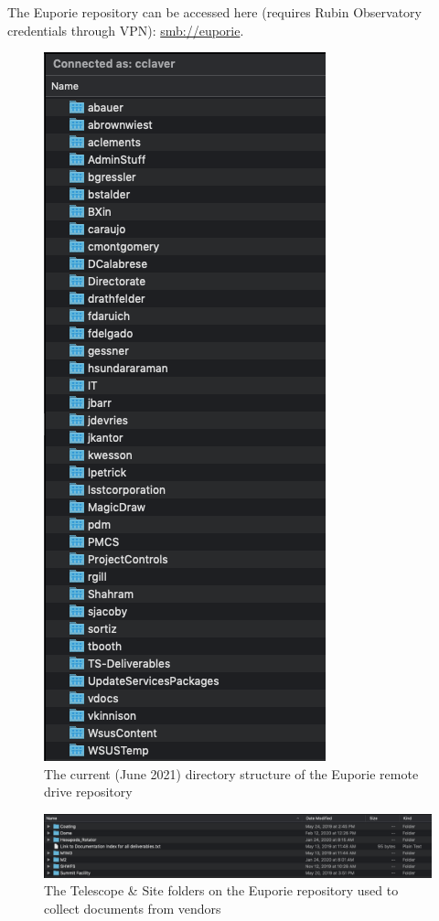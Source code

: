 The Euporie repository can be accessed here (requires Rubin Observatory credentials through VPN): \url{smb://euporie}.

\begin{figure}
\begin{center}
  \includegraphics[scale=0.5]{Figures/EuporieDirectory.png}
\end{center}
\caption{\label{fig:EuporyDirectory} The current (June 2021) directory structure of the Euporie remote drive repository}
\end{figure}

\begin{figure}
\begin{center}
  \includegraphics[scale=0.33]{Figures/EuporieTS.png}
\end{center}
\caption{\label{fig:EuporyTS} The Telescope \& Site folders on the Euporie repository used to collect documents from vendors}
\end{figure}


